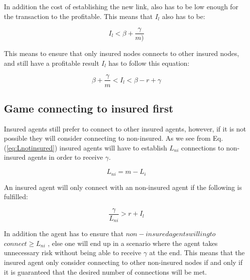 In addition the cost of establishing the new link, also has to be low enough for the transaction to the profitable. This means that $I_{l}$ also has to be:

\begin{equation}
I_{l} < \beta + \frac{\gamma}{ m)} 
\label{eq:solutionToBlockNonInsured3}
\end{equation}

This means to ensure that only insured nodes connects to other insured nodes, and still have a profitable result $I_{l}$ has to follow this equation: 

\begin{equation}
  \beta + \frac{\gamma}{ m} <I_{l}< \beta - r + \gamma
\label{eq:solutionToBlockNonInsured4}
\end{equation}


\subsection{Game connecting to insured first}
Insured agents still prefer to connect to other insured agents, however, if it is not possible they will consider connecting to non-insured. As we see from Eq.(\ref{eq:Lnotinsured}) insured agents will have to establish $L_{ni}$ connections to non-insured agents in order to receive $\gamma$. 

\begin{equation} 
L_{ni} = m - L_{i} 
\label{eq:Lnotinsured}
\end{equation}



An insured agent will only connect with an non-insured agent if the following is fulfilled:

\begin{equation}
\frac{\gamma}{ L_{ni}}  > r +  I_{l}
\label{eq:gammaovernotinsured}
\end{equation}

In addition the agent has to ensure that $non-insured $\:$ agents $\:$ willing $\:$ to $\:$ connect \ge L_{ni}$ , else one will end up in a scenario where the agent takes unnecessary risk without being able to receive $\gamma$ at the end. This means that the insured agent only consider connecting to other non-insured nodes if and only if it is guaranteed that the desired number of connections will be met. 

